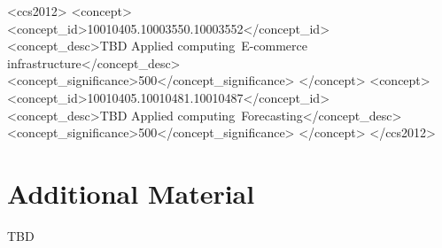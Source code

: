 \documentclass[sigconf]{acmart}
\begin{document}
\author{PW ...}



\renewcommand{\shortauthors}{G. von Laszewski, et. al.}



\begin{CCSXML}
<ccs2012>
 <concept>
  <concept_id>10010405.10003550.10003552</concept_id>
  <concept_desc>TBD Applied computing~E-commerce infrastructure</concept_desc>
  <concept_significance>500</concept_significance>
 </concept>
 <concept>
  <concept_id>10010405.10010481.10010487</concept_id>
  <concept_desc>TBD Applied computing~Forecasting</concept_desc>
  <concept_significance>500</concept_significance>
 </concept>
</ccs2012>
\end{CCSXML}



\maketitle









\appendix

\section{Additional Material}

TBD
\end{document}
